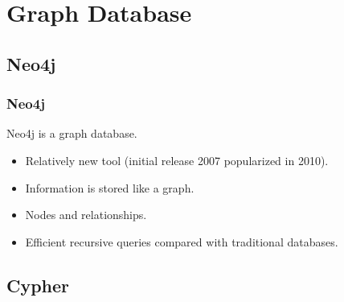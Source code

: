 \documentclass{beamer}
\begin{document}
\section[Graph DB]{Graph Database}
\subsection{Neo4j}

\begin{frame}
	\frametitle{Neo4j}
	
	Neo4j is a graph database.
		\begin{itemize}
		\item Relatively new tool (initial release 2007 popularized in 2010).
		\item Information is stored like a graph.
		\item Nodes and relationships.
		\item Efficient recursive queries compared with traditional databases.
		\end{itemize}

\end{frame}

\subsection{Cypher}
\end{document}
